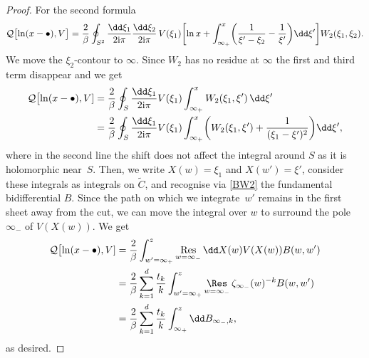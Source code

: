 \documentclass[10pt,a4paper]{amsart}
\numberwithin{equation}{section}
\begin{document}
\begin{proof}
For the second formula
\begin{equation*}
\mathcal{Q}\bigl[\ln(x - \bullet),V\bigr] = \frac{2}{\beta} \oint_{S^2} \frac{\dd \xi_1}{2{\rm i}\pi} \frac{\dd\xi_2}{2{\rm i}\pi}\,V(\xi_1)\biggl[\ln x + \int_{\infty_+}^{x} \biggl(\frac{1}{\xi' - \xi_2} - \frac{1}{\xi'}\biggr)\dd \xi'\biggr] W_2(\xi_1,\xi_2).
\end{equation*}
We move the $\xi_2$-contour to $\infty$. Since $W_2$ has no residue at $\infty$ the first and third term disappear and we get
\begin{align*}
\mathcal{Q}\bigl[\ln(x - \bullet),V] &{} = \frac{2}{\beta} \oint_{S} \frac{\dd \xi_1}{2{\rm i}\pi} V(\xi_1) \int_{\infty_+}^{x} W_2(\xi_1,\xi') \,\dd \xi' \\
&{} =\frac{2}{\beta} \oint_{S} \frac{\dd \xi_1}{2{\rm i}\pi} V(\xi_1) \int_{\infty_+}^{x} \biggl(W_2(\xi_1,\xi') + \frac{1}{(\xi_1 - \xi')^2}\biggr)\dd \xi',
\end{align*}
where in the second line the shift does not affect the integral around $S$ as it is holomorphic near~$S$. Then, we write $X(w) = \xi_1$ and $X(w') = \xi'$, consider these integrals as integrals on $\widetilde{C}$, and recognise via \eqref{BW2} the fundamental bidifferential $B$. Since the path on which we integrate~$w'$ remains in the first sheet away from the cut, we can move the integral over $w$ to surround the pole $\infty_-$ of $V(X(w))$. We get
\begin{align*}
\mathcal{Q}\bigl[\ln(x - \bullet),V] &{} = \frac{2}{\beta} \int_{w' = \infty_+}^{z} \mathop{{\rm Res}}_{w = \infty_-} \dd X(w)V(X(w))B(w,w') \\
&{} = \frac{2}{\beta} \sum_{k = 1}^{d} \frac{t_k}{k} \int_{w' = \infty_+}^{z} \mathop{{\rm \Res}}_{w = \infty_-} \zeta_{\infty_-}(w)^{-k} B(w,w') \\
&{} = \frac{2}{\beta} \sum_{k = 1}^{d} \frac{t_k}{k} \int_{\infty_+}^{z} \dd B_{\infty_-,k},
\end{align*}
as desired.


\end{proof}
\end{document}
